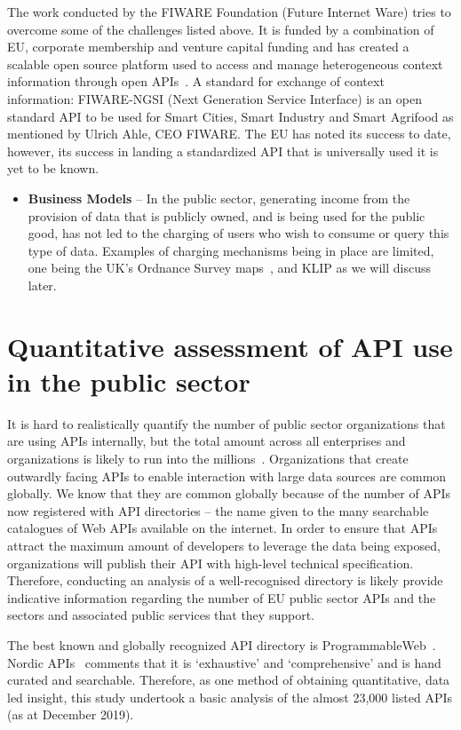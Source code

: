 The work conducted by the FIWARE Foundation (Future Internet Ware) tries to
overcome some of the challenges listed above. It is funded by a combination
of EU, corporate membership and venture capital funding and has
created a scalable open source platform used to access and manage heterogeneous context information through
open APIs~\citep{eu_innovation_programmes}. A standard for exchange of context information: FIWARE-NGSI
(Next Generation Service Interface) is an open standard API to be used for Smart
Cities, Smart Industry and Smart Agrifood as mentioned by Ulrich Ahle, CEO FIWARE. The EU has noted its success to
date, however, its success in landing a standardized API that is universally
used it is yet to be known.
\begin{itemize}
	\item \textbf{Business Models} – In the public sector, generating income from the
	provision of data that is publicly owned, and is being used for the
	public good, has not led to the charging of users who wish to consume
	or query this type of data. Examples of charging mechanisms being in place
	are	limited, one being the UK’s Ordnance Survey maps~\citep{os_places}, and KLIP 
	as we will discuss later.
\end{itemize}

\section{Quantitative assessment of API use in the public sector}

It is hard to realistically quantify the number of public sector organizations
that are using APIs internally, but the total amount across all enterprises
and organizations is likely to run into the millions~\citep{deloitte_insights}. Organizations
that create outwardly facing APIs to enable interaction with large data sources
are common globally. We know that they are common globally because of the
number of APIs now registered with API directories – the name given to the
many searchable catalogues of Web APIs available on the internet. In order
to ensure that APIs attract the maximum amount of developers to leverage the
data being exposed, organizations will publish their API with high-level
technical specification. Therefore, conducting an analysis of a well-recognised
directory is likely provide indicative information regarding the number of EU
public sector APIs and the sectors and associated public services that they support.

The best known and globally recognized API directory is ProgrammableWeb~\citep{programmableweb_search}.
Nordic APIs~\citep{nordic_apis} comments that it is ‘exhaustive’ and ‘comprehensive’ and is hand
curated and searchable. Therefore, as one method of obtaining quantitative,
data led insight, this study undertook a basic analysis of the almost 23,000
listed APIs (as at December 2019).

